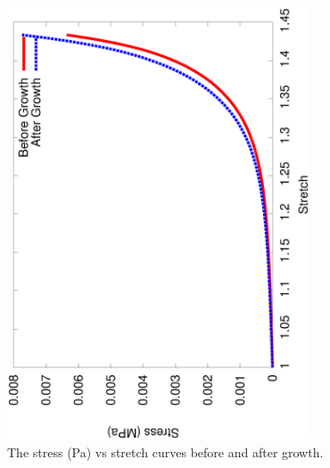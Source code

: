 \begin{figure}[!hpt]
  \centering
  \includegraphics[angle=270,width=0.8\textwidth]{images/examples/lagrangian/swelling/stress-stretch}
  \caption{The stress (Pa) vs stretch curves before and after growth.}
  \label{stress_strain}
\end{figure}


